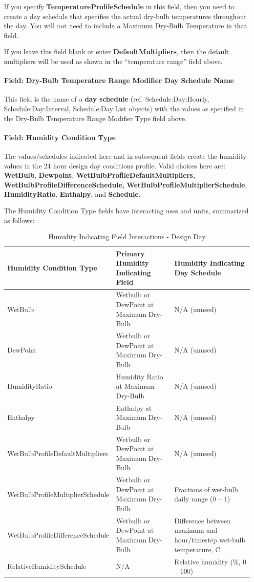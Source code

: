 If you specify \textbf{TemperatureProfileSchedule} in this field, then you need to create a day schedule that specifies the actual dry-bulb temperatures throughout the day. You will not need to include a Maximum Dry-Bulb Temperature in that field.

If you leave this field blank or enter \textbf{DefaultMultipliers}, then the default multipliers will be used as shown in the ``temperature range'' field above.

\paragraph{Field: Dry-Bulb Temperature Range Modifier Day Schedule Name}\label{field-dry-bulb-temperature-range-modifier-day-schedule-name}

This field is the name of a \textbf{day schedule} (ref. Schedule:Day:Hourly, Schedule:Day:Interval, Schedule:Day:List objects) with the values as specified in the Dry-Bulb Temperature Range Modifier Type field above.

\paragraph{Field: Humidity Condition Type}\label{field-humidity-condition-type}

The values/schedules indicated here and in subsequent fields create the humidity values in the 24 hour design day conditions profile. Valid choices here are: \textbf{WetBulb}, \textbf{Dewpoint}, \textbf{WetBulbProfileDefaultMultipliers, WetBulbProfileDifferenceSchedule,} \textbf{WetBulbProfileMultiplierSchedule}, \textbf{HumidityRatio}, \textbf{Enthalpy}, and \textbf{Schedule.}

The Humidity Condition Type fields have interacting uses and units, summarized as follows:

\begin{longtable}[c]{p{2.25in}p{1.75in}p{2.0in}}
\caption{Humidity Indicating Field Interactions - Design Day \protect \label{table:humidity-indicating-field-interactions-design}}\\
\toprule 
Humidity Condition Type & Primary Humidity Indicating Field & Humidity Indicating Day Schedule \tabularnewline \midrule
\endhead
WetBulb & Wetbulb or DewPoint at Maximum Dry-Bulb & N/A (unused) \tabularnewline
DewPoint & Wetbulb or DewPoint at Maximum Dry-Bulb & N/A (unused) \tabularnewline
HumidityRatio & Humidity Ratio at Maximum Dry-Bulb & N/A (unused) \tabularnewline
Enthalpy & Enthalpy at Maximum Dry-Bulb & N/A (unused) \tabularnewline
WetBulbProfile\-DefaultMultipliers & Wetbulb or DewPoint at Maximum Dry-Bulb & N/A (unused) \tabularnewline
WetBulbProfile\-MultiplierSchedule & Wetbulb or DewPoint at Maximum Dry-Bulb & Fractions of wet-bulb daily range (0 – 1) \tabularnewline
WetBulbProfile\-DifferenceSchedule & Wetbulb or DewPoint at Maximum Dry-Bulb & Difference between maximum and hour/timestep wet-bulb temperature, C \tabularnewline
RelativeHumidity\-Schedule & N/A & Relative humidity (\%, 0 – 100) \tabularnewline
\bottomrule
\end{longtable}

